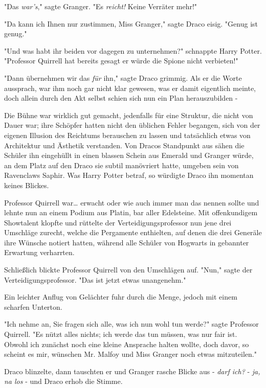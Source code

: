 {"Das \emph{war's}," sagte Granger. "Es \emph{reicht!} Keine Verräter mehr!"

"Da kann ich Ihnen nur zustimmen, Miss Granger," sagte Draco eisig. "Genug ist genug."

"Und was habt ihr beiden vor dagegen zu unternehmen?" schnappte Harry Potter. "Professor Quirrell hat bereits gesagt er würde die Spione nicht verbieten!"

"Dann übernehmen wir das \emph{für} ihn," sagte Draco grimmig. Als er die Worte aussprach, war ihm noch gar nicht klar gewesen, was er damit eigentlich meinte, doch allein durch den Akt selbst schien sich nun ein Plan herauszubilden -

\later

Die Bühne war wirklich gut gemacht, jedenfalls für eine Struktur, die nicht von Dauer war; ihre Schöpfer hatten nicht den üblichen Fehler begangen, sich von der eigenen Illusion des Reichtums berauschen zu lassen und tatsächlich etwas von Architektur und Ästhetik verstanden. Von Dracos Standpunkt aus sähen die Schüler ihn eingehüllt in einen blassen Schein aus Emerald und Granger würde, an dem Platz auf den Draco sie subtil manövriert hatte, umgeben sein von Ravenclaws Saphir. Was Harry Potter betraf, so würdigte Draco ihn momentan keines Blickes.

Professor Quirrell war… erwacht oder wie auch immer man das nennen sollte und lehnte nun an einem Podium aus Platin, bar aller Edelsteine. Mit offenkundigem Showtalent klopfte und rüttelte der Verteidigungsprofessor nun jene drei Umschläge zurecht, welche die Pergamente enthielten, auf denen die drei Generäle ihre Wünsche notiert hatten, während alle Schüler von Hogwarts in gebannter Erwartung verharrten.

Schließlich blickte Professor Quirrell von den Umschlägen auf. "Nun," sagte der Verteidigungsprofessor. "Das ist jetzt etwas unangenehm."

Ein leichter Anflug von Gelächter fuhr durch die Menge, jedoch mit einem scharfen Unterton.

"Ich nehme an, Sie fragen sich alle, was ich nun wohl tun werde?" sagte Professor Quirrell. "Es nützt alles nichts; ich werde das tun müssen, was nur fair ist. Obwohl ich zunächst noch eine kleine Ansprache halten wollte, doch davor, so scheint es mir, wünschen Mr. Malfoy und Miss Granger noch etwas mitzuteilen."

Draco blinzelte, dann tauschten er und Granger rasche Blicke aus - \emph{darf ich?} - \emph{ja,} \emph{na los} - und Draco erhob die Stimme.

}
